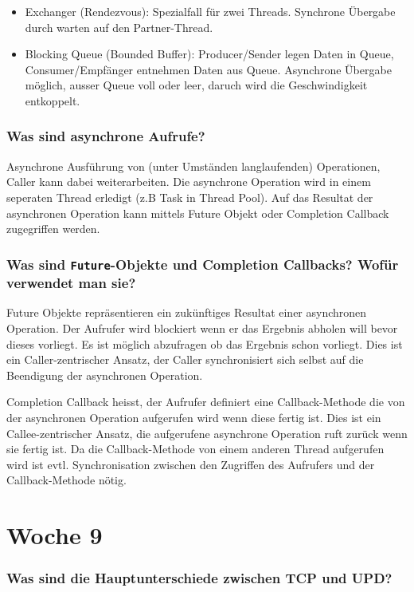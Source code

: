 \documentclass[10pt,a4paper]{scrartcl}
\begin{document}
\begin{itemize}
	\item Exchanger (Rendezvous): Spezialfall für zwei Threads. Synchrone Übergabe durch warten auf
		den Partner-Thread.
	\item Blocking Queue (Bounded Buffer): Producer/Sender legen Daten in Queue, Consumer/Empfänger
		entnehmen Daten aus Queue. Asynchrone Übergabe möglich, ausser Queue voll oder leer, daruch wird
		die Geschwindigkeit entkoppelt.
\end{itemize}
  
\subsubsection{Was sind asynchrone Aufrufe?}

Asynchrone Ausführung von (unter Umständen langlaufenden) Operationen, Caller kann dabei
weiterarbeiten. Die asynchrone Operation wird in einem seperaten Thread erledigt (z.B Task in
Thread Pool). Auf das Resultat der asynchronen Operation kann mittels Future Objekt oder Completion
Callback zugegriffen werden.
  
\subsubsection{Was sind \texttt{Future}-Objekte und Completion Callbacks? Wofür verwendet man sie?}

Future Objekte repräsentieren ein zukünftiges Resultat einer asynchronen Operation. Der Aufrufer
wird blockiert wenn er das Ergebnis abholen will bevor dieses vorliegt. Es ist möglich abzufragen
ob das Ergebnis schon vorliegt. Dies ist ein Caller-zentrischer Ansatz, der Caller synchronisiert
sich selbst auf die Beendigung der asynchronen Operation.

Completion Callback heisst, der Aufrufer definiert eine Callback-Methode die von der asynchronen
Operation aufgerufen wird wenn diese fertig ist. Dies ist ein Callee-zentrischer Ansatz, die
aufgerufene asynchrone Operation ruft zurück wenn sie fertig ist. Da die Callback-Methode von einem
anderen Thread aufgerufen wird ist evtl. Synchronisation zwischen den Zugriffen des Aufrufers und
der Callback-Methode nötig.
  

\section{Woche 9}
 
\subsubsection{Was sind die Hauptunterschiede zwischen TCP und UPD?}
\end{document}
